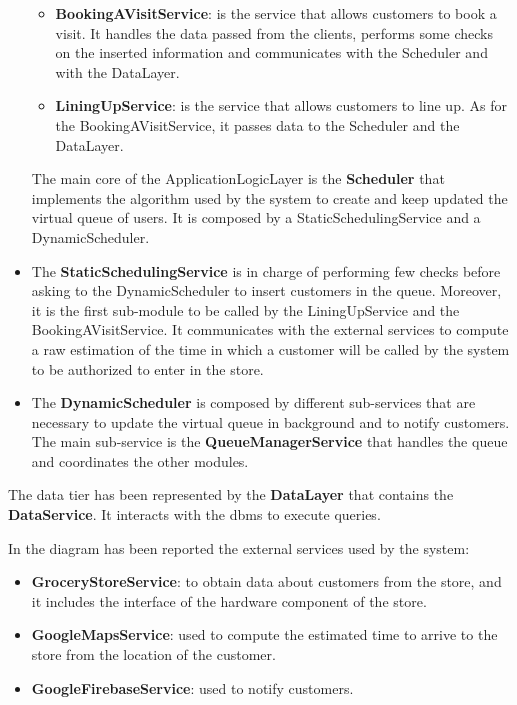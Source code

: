 \begin{itemize}
\begin{itemize}
        \item \textbf{BookingAVisitService}: is the service that allows customers to book a visit. It handles the data passed from the clients, performs some checks on the inserted information and communicates with the Scheduler and with the DataLayer.
        \item \textbf{LiningUpService}: is the service that allows customers to line up. As for the BookingAVisitService, it passes data to the Scheduler and the DataLayer.
    \end{itemize}

    The main core of the ApplicationLogicLayer is the \textbf{Scheduler} that implements the algorithm used by the system to create and keep updated the virtual queue of users. It is composed by a StaticSchedulingService and a DynamicScheduler.
    \item The \textbf{StaticSchedulingService} is in charge of performing few checks before asking to the DynamicScheduler to insert customers in the queue. Moreover, it is the first sub-module to be called by the LiningUpService and the BookingAVisitService. It communicates with the external services to compute a raw estimation of the time in which a customer will be called by the system to be authorized to enter in the store.
    \item The \textbf{DynamicScheduler} is composed by different sub-services that are necessary to update the virtual queue in background and to notify customers.
    The main sub-service is the \textbf{QueueManagerService} that handles the queue and coordinates the other modules.
\end{itemize}

The data tier has been represented by the \textbf{DataLayer} that contains the \textbf{DataService}. It interacts with the \gls{dbms} to execute queries.

In the diagram has been reported the external services used by the system:
\begin{itemize}
    \item \textbf{GroceryStoreService}: to obtain data about customers from the store, and it includes the interface of the hardware component of the store.
    \item \textbf{GoogleMapsService}: used to compute the estimated time to arrive to the store from the location of the customer.
    \item \textbf{GoogleFirebaseService}: used to notify customers.
\end{itemize}



